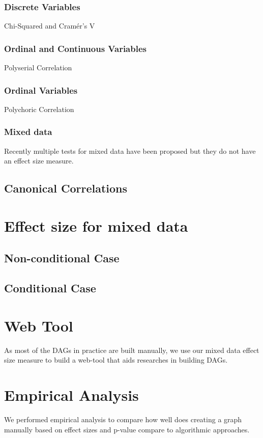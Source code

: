 \documentclass{article}
\begin{document}
\subsubsection{Discrete Variables}

Chi-Squared and Cram\'er's V

\subsubsection{Ordinal and Continuous Variables}
Polyserial Correlation

\subsubsection{Ordinal Variables}
Polychoric Correlation

\subsubsection{Mixed data}
Recently multiple tests for mixed data have been proposed but they do not have
an effect size measure. 

\subsection{Canonical Correlations}

\section{Effect size for mixed data}
\subsection{Non-conditional Case}
\subsection{Conditional Case}

\section{Web Tool}
As most of the DAGs in practice are built manually, we use our mixed data effect size measure to build a web-tool that aids researches in building DAGs.

\section{Empirical Analysis}
We performed empirical analysis to compare how well does creating a graph manually based on effect sizes and p-value compare to algorithmic approaches.
\end{document}
